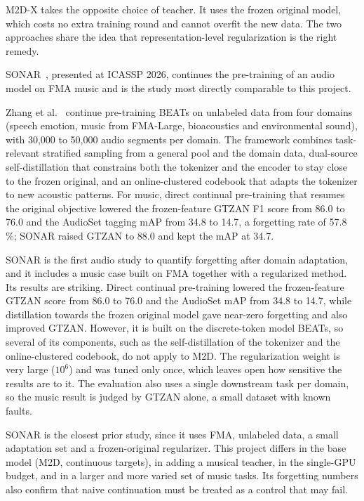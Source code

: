 \documentclass{FastFyp}
\begin{document}
\lrrelation
M2D-X takes the opposite choice of teacher. It uses the frozen original model, which costs no extra training round and cannot overfit the new data. The two approaches share the idea that representation-level regularization is the right remedy.

SONAR~\cite{ref:Zhang:2025sonar}, presented at ICASSP 2026, continues the pre-training of an audio model on FMA music and is the study most directly comparable to this project.

\lrsummary
Zhang et al.~\cite{ref:Zhang:2025sonar} continue pre-training BEATs on unlabeled data from four domains (speech emotion, music from FMA-Large, bioacoustics and environmental sound), with 30,000 to 50,000 audio segments per domain. The framework combines task-relevant stratified sampling from a general pool and the domain data, dual-source self-distillation that constrains both the tokenizer and the encoder to stay close to the frozen original, and an online-clustered codebook that adapts the tokenizer to new acoustic patterns. For music, direct continual pre-training that resumes the original objective lowered the frozen-feature GTZAN F1 score from 86.0 to 76.0 and the AudioSet tagging mAP from 34.8 to 14.7, a forgetting rate of 57.8\,\%; SONAR raised GTZAN to 88.0 and kept the mAP at 34.7.

\lrcritical
SONAR is the first audio study to quantify forgetting after domain adaptation, and it includes a music case built on FMA together with a regularized method. Its results are striking. Direct continual pre-training lowered the frozen-feature GTZAN score from 86.0 to 76.0 and the AudioSet mAP from 34.8 to 14.7, while distillation towards the frozen original model gave near-zero forgetting and also improved GTZAN. However, it is built on the discrete-token model BEATs, so several of its components, such as the self-distillation of the tokenizer and the online-clustered codebook, do not apply to M2D. The regularization weight is very large ($10^{6}$) and was tuned only once, which leaves open how sensitive the results are to it. The evaluation also uses a single downstream task per domain, so the music result is judged by GTZAN alone, a small dataset with known faults.

\lrrelation
SONAR is the closest prior study, since it uses FMA, unlabeled data, a small adaptation set and a frozen-original regularizer. This project differs in the base model (M2D, continuous targets), in adding a musical teacher, in the single-GPU budget, and in a larger and more varied set of music tasks. Its forgetting numbers also confirm that naive continuation must be treated as a control that may fail.
\end{document}
